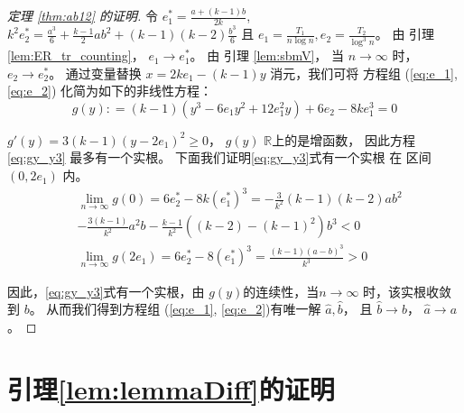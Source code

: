 \begin{proof}[定理 \ref{thm:ab12} 的证明]
	令 $e^*_1 = \frac{a+(k-1)b}{2k}$, $k^2 e^*_2 = \frac{a^3}{6} + \frac{k-1}{2}ab^2 + (k-1)(k-2)\frac{b^3}{6}$
	且 $e_1 = \frac{T_1}{n\log n}, e_2 = \frac{T_2}{\log^3 n}$。
	由 引理
  \ref{lem:ER_tr_counting}， $e_1 \to e^*_1$。
	由 引理 \ref{lem:sbmV}， 当 $n\to \infty$ 时，
  $e_2 \to e^*_2$。
	通过变量替换 $x=2ke_1 - (k-1)y$ 消元，我们可将
  方程组 (\ref{eq:e_1}, \ref{eq:e_2})
  化简为如下的非线性方程：
\begin{equation}\label{eq:gy_y3}
g(y): = (k-1)(y^3 - 6 e_1 y^2 + 12 e_1^2 y) + 6 e_2 - 8 k e_1^3 = 0
\end{equation}

$g'(y) = 3(k-1)(y-2e_1)^2 \geq 0 $，
$g(y)$ $\mathbb{R}$上的是增函数，
因此方程\eqref{eq:gy_y3} 最多有一个实根。
下面我们证明\eqref{eq:gy_y3}式有一个实根
在 区间 $(0, 2e_1)$ 内。
\begin{align*}
&\lim_{n\to \infty}g(0) =  6e^*_2 - 8k(e^*_1)^3 =-\frac{3}{k^2}(k-1)(k-2)ab^2 \\
&-\frac{3(k-1)}{k^2}a^2b - \frac{k-1}{k^2} ((k-2)-(k-1)^2)b^3 < 0 \\
&\lim_{n\to \infty}g(2e_1) = 6e^*_2 - 8(e^*_1)^3 = \frac{(k-1)(a-b)^3}{k^3} > 0
\end{align*}

因此，\eqref{eq:gy_y3}式有一个实根，由 $g(y)$的连续性，当$n\to \infty $ 时，该实根收敛到 $b$。
从而我们得到方程组 (\ref{eq:e_1}, \ref{eq:e_2})有唯一解 $\hat{a},\hat{b}$，
且
$\hat{b} \to b$， $\hat{a} \to a$。
\end{proof}

\section{引理\ref{lem:lemmaDiff}的证明}

